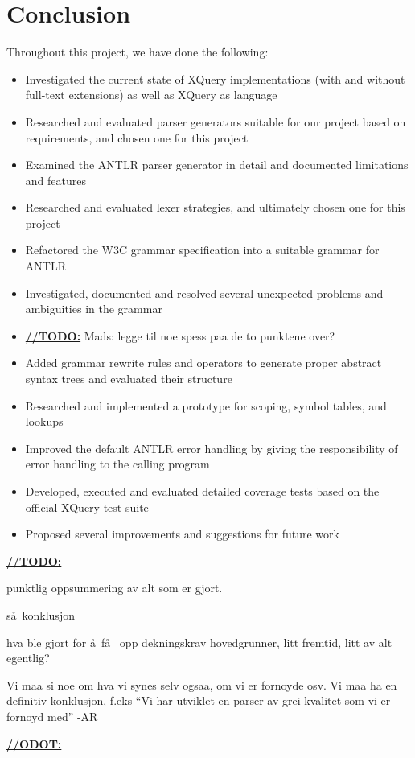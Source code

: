 \chapter{Conclusion}
Throughout this project, we have done the following:
\begin{itemize}
  \item Investigated the current state of XQuery implementations (with and
  without full-text extensions) as well as XQuery as language
  \item Researched and evaluated parser generators suitable
  for our project based on requirements, and chosen one for this project
  \item Examined the ANTLR parser generator in detail and documented
  limitations and features
  \item Researched and evaluated lexer strategies, and ultimately chosen one
  for this project
  \item Refactored the W3C grammar specification into a suitable grammar for
  ANTLR
  \item Investigated, documented and resolved several unexpected problems and
  ambiguities in the grammar
  \item \underline{\textbf{\LARGE //TODO:}} Mads: legge til noe spess paa de to
  punktene over?
  \item Added grammar rewrite rules and operators to generate proper abstract
  syntax trees and evaluated their structure
  \item Researched and implemented a prototype for scoping, symbol tables, and
  lookups
  \item Improved the default ANTLR error handling by giving the responsibility
  of error handling to the calling program
  \item Developed, executed and evaluated detailed coverage tests based on the
  official XQuery test suite
  \item Proposed several improvements and suggestions for future work
\end{itemize}


\underline{\textbf{\LARGE //TODO:}}

punktlig oppsummering av alt som er gjort.

s\aa~konklusjon

hva ble gjort for \aa ~f\aa~ opp dekningskrav hovedgrunner, litt fremtid, litt
av alt egentlig? 

Vi maa si noe om hva vi synes selv ogsaa, om vi er fornoyde osv. Vi maa ha en
definitiv konklusjon, f.eks ``Vi har utviklet en parser av grei kvalitet som vi
er fornoyd med'' 
-AR

\underline{\textbf{\LARGE //ODOT:}}